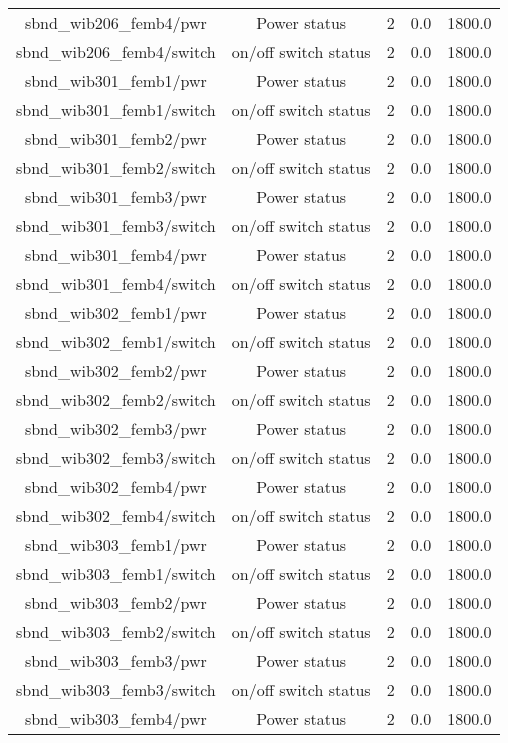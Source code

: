 \begin{table}[ptb]
\begin{tabular}{c | c c c c}
sbnd_wib206_femb4/pwr & Power status & 2 & 0.0 & 1800.0\\ 
sbnd_wib206_femb4/switch & on/off switch status & 2 & 0.0 & 1800.0\\ 
sbnd_wib301_femb1/pwr & Power status & 2 & 0.0 & 1800.0\\ 
sbnd_wib301_femb1/switch & on/off switch status & 2 & 0.0 & 1800.0\\ 
sbnd_wib301_femb2/pwr & Power status & 2 & 0.0 & 1800.0\\ 
sbnd_wib301_femb2/switch & on/off switch status & 2 & 0.0 & 1800.0\\ 
sbnd_wib301_femb3/pwr & Power status & 2 & 0.0 & 1800.0\\ 
sbnd_wib301_femb3/switch & on/off switch status & 2 & 0.0 & 1800.0\\ 
sbnd_wib301_femb4/pwr & Power status & 2 & 0.0 & 1800.0\\ 
sbnd_wib301_femb4/switch & on/off switch status & 2 & 0.0 & 1800.0\\ 
sbnd_wib302_femb1/pwr & Power status & 2 & 0.0 & 1800.0\\ 
sbnd_wib302_femb1/switch & on/off switch status & 2 & 0.0 & 1800.0\\ 
sbnd_wib302_femb2/pwr & Power status & 2 & 0.0 & 1800.0\\ 
sbnd_wib302_femb2/switch & on/off switch status & 2 & 0.0 & 1800.0\\ 
sbnd_wib302_femb3/pwr & Power status & 2 & 0.0 & 1800.0\\ 
sbnd_wib302_femb3/switch & on/off switch status & 2 & 0.0 & 1800.0\\ 
sbnd_wib302_femb4/pwr & Power status & 2 & 0.0 & 1800.0\\ 
sbnd_wib302_femb4/switch & on/off switch status & 2 & 0.0 & 1800.0\\ 
sbnd_wib303_femb1/pwr & Power status & 2 & 0.0 & 1800.0\\ 
sbnd_wib303_femb1/switch & on/off switch status & 2 & 0.0 & 1800.0\\ 
sbnd_wib303_femb2/pwr & Power status & 2 & 0.0 & 1800.0\\ 
sbnd_wib303_femb2/switch & on/off switch status & 2 & 0.0 & 1800.0\\ 
sbnd_wib303_femb3/pwr & Power status & 2 & 0.0 & 1800.0\\ 
sbnd_wib303_femb3/switch & on/off switch status & 2 & 0.0 & 1800.0\\ 
sbnd_wib303_femb4/pwr & Power status & 2 & 0.0 & 1800.0\\ 

\end{tabular}
\end{table}
